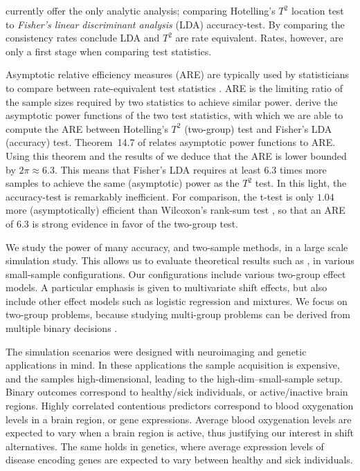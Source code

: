 \documentclass[oupdraft]{bio}
\begin{document}
\cite{ramdas_classification_2016} currently offer the only analytic analysis; comparing Hotelling's $T^2$ location test to \emph{Fisher's linear discriminant analysis} (LDA) accuracy-test. 
By comparing the consistency rates \cite{ramdas_classification_2016} conclude LDA and $T^2$ are rate equivalent.
Rates, however, are only a first stage when comparing test statistics. 

Asymptotic relative efficiency measures (ARE) are typically used by statisticians to compare between rate-equivalent test statistics \citep{vaart_asymptotic_1998}.
ARE is the limiting ratio of the sample sizes required by two statistics to achieve similar power. 
\citet{ramdas_classification_2016} derive the asymptotic power functions of the two test statistics, with which we are able to compute the ARE between Hotelling's $T^2$ (two-group) test and Fisher's LDA (accuracy) test.
Theorem~14.7 of \cite{vaart_asymptotic_1998} relates asymptotic power functions to ARE.
Using this theorem and the results of \cite{ramdas_classification_2016} we deduce that the ARE is lower bounded by $2 \pi \approx 6.3$.
This means that Fisher's LDA requires at least $6.3$ times more samples to achieve the same (asymptotic) power as the $T^2$ test. 
In this light, the accuracy-test is remarkably inefficient.  
For comparison, the t-test is only $1.04$ more (asymptotically) efficient than Wilcoxon's rank-sum test \citep{lehmann_parametric_2009}, so that an ARE of $6.3$ is strong evidence in favor of the two-group test. 

We study the power of many accuracy, and two-sample methods, in a large scale simulation study. 
This allows us to evaluate theoretical results such as \citet{ramdas_classification_2016}, in various small-sample configurations.
Our configurations include various two-group effect models. 
A particular emphasis is given to multivariate shift effects, but also include other effect models such as logistic regression and  mixtures. 
We focus on two-group problems, because studying multi-group problems can be derived from multiple binary decisions \citep{zheng2018extrapolating}.

The simulation scenarios were designed with neuroimaging and genetic applications in mind. 
In these applications the sample acquisition is expensive, and the samples high-dimensional, leading to the high-dim--small-sample setup.
Binary outcomes correspond to healthy/sick individuals, or active/inactive brain regions.
Highly correlated contentious predictors correspond to blood oxygenation levels in a brain region, or gene expressions.
Average blood oxygenation levels are expected to vary when a brain region is active, thus justifying our interest in shift alternatives. 
The same holds in genetics, where average expression levels of disease encoding genes are expected to vary between healthy and sick individuals. 
\end{document}
